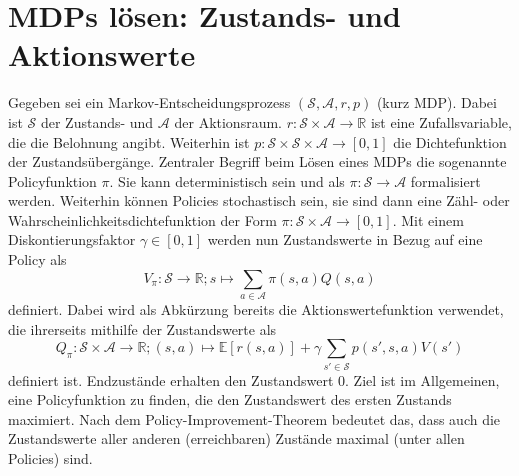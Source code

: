 \section{MDPs lösen: Zustands- und Aktionswerte}
Gegeben sei ein Markov-Entscheidungsprozess $(\mathcal{S}, \mathcal{A}, r, p)$ (kurz MDP).
Dabei ist $\mathcal{S}$ der Zustands- und $\mathcal{A}$ der Aktionsraum.
$r: \mathcal{S} \times \mathcal{A} \rightarrow \mathbb{R}$ ist eine Zufallsvariable, die die Belohnung angibt.
Weiterhin ist $p: \mathcal{S} \times \mathcal{S} \times \mathcal{A} \rightarrow [0,1]$ die Dichtefunktion der Zustandsübergänge.
Zentraler Begriff beim Lösen eines MDPs die sogenannte Policyfunktion $\pi$.
Sie kann deterministisch sein und als $\pi: \mathcal{S} \rightarrow \mathcal{A}$ formalisiert werden.
Weiterhin können Policies stochastisch sein, sie sind dann eine Zähl- oder Wahrscheinlichkeitsdichtefunktion der Form $\pi: \mathcal{S}\times\mathcal{A}\rightarrow [0, 1]$.
Mit einem Diskontierungsfaktor $\gamma \in [0,1]$ werden nun Zustandswerte in Bezug auf eine Policy als
\begin{equation}
    V_\pi: \mathcal{S} \rightarrow \mathbb{R}; s \mapsto \sum_{a\in\mathcal{A}}\pi(s, a) Q(s, a)
\end{equation}
definiert.
Dabei wird als Abkürzung bereits die Aktionswertefunktion verwendet, die ihrerseits mithilfe der Zustandswerte als
\begin{equation}
    Q_\pi: \mathcal{S} \times \mathcal{A} \rightarrow \mathbb{R}; (s, a) \mapsto \mathbb{E}\left[r(s,a)\right]+\gamma \sum_{s'\in\mathcal{S}}{p\left(s', s, a\right) V\left(s'\right)}
\end{equation}
definiert ist.
Endzustände erhalten den Zustandswert 0.
Ziel ist im Allgemeinen, eine Policyfunktion zu finden, die den Zustandswert des ersten Zustands maximiert.
Nach dem Policy-Improvement-Theorem bedeutet das, dass auch die Zustandswerte aller anderen (erreichbaren) Zustände maximal (unter allen Policies) sind.

